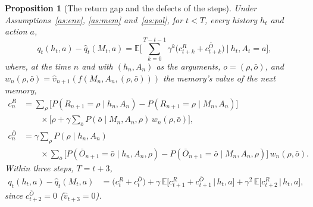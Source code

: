 \documentclass{article}
\newtheorem{proposition}{Proposition}[section]
\theoremstyle{definition}
\theoremstyle{remark}
\newcommand{\E}{\mathbb{E}}
\newcommand{\Ob}{\bar O}
\begin{document}
\begin{proposition}[The return gap and the defects of the steps]\label{prop:gap}
Under Assumptions~\ref{as:env}, \ref{as:mem} and~\ref{as:pol}, for $t<T$, every history $h_t$ and action $a$,
\[
q_t(h_t,a)-\hat q_t(M_t,a)=\E\Big[\sum_{k=0}^{T-t-1}\gamma^k\big(c^R_{t+k}+c^{\Ob}_{t+k}\big)\ \Big|\ h_t,A_t=a\Big],
\]
where, at the time $n$ and with $(h_n,A_n)$ as the arguments, $o=(\rho,\bar o)$, and $w_n(\rho,\bar o)=\hat v_{n+1}(f(M_n,A_n,(\rho,\bar o)))$ the memory's value of the next memory,
\begin{align*}
c^R_n&=\sum_\rho\big[P(R_{n+1}=\rho\mid h_n,A_n)-P(R_{n+1}=\rho\mid M_n,A_n)\big]\\
&\qquad\times\Big[\rho+\gamma\sum_{\bar o}P(\bar o\mid M_n,A_n,\rho)\,w_n(\rho,\bar o)\Big],\\
c^{\Ob}_n&=\gamma\sum_\rho P(\rho\mid h_n,A_n)\\
&\qquad\times\sum_{\bar o}\big[P(\Ob_{n+1}=\bar o\mid h_n,A_n,\rho)-P(\Ob_{n+1}=\bar o\mid M_n,A_n,\rho)\big]\,w_n(\rho,\bar o).
\end{align*}
Within three steps, $T=t+3$,
\begin{align*}
q_t(h_t,a)-\hat q_t(M_t,a)&=\big(c^R_t+c^{\Ob}_t\big)+\gamma\,\E\big[c^R_{t+1}+c^{\Ob}_{t+1}\,\big|\,h_t,a\big]+\gamma^2\,\E\big[c^R_{t+2}\,\big|\,h_t,a\big],
\end{align*}
since $c^{\Ob}_{t+2}=0$ ($\hat v_{t+3}=0$).
\end{proposition}
\end{document}
